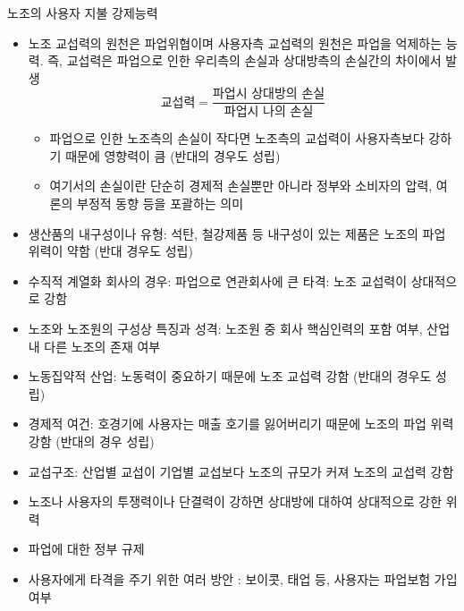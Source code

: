\documentclass[aspectratio=169,xcolor=dvipsnames,handout]{beamer}
\begin{document}
\begin{frame}[allowframebreaks]{노조의 사용자 지불 강제능력}
    \begin{itemize}[<+->]
        \item 노조 교섭력의 원천은 파업위협이며 사용자측 교섭력의 원천은 파업을 억제하는 능력. 즉, 교섭력은 파업으로 인한 우리측의 손실과 상대방측의 손실간의 차이에서 발생
            \[\text{교섭력} = \frac{\text{파업시 상대방의 손실}}{\text{파업시 나의 손실}}\]
        \begin{itemize}[<+->]
            \item 파업으로 인한 노조측의 손실이 작다면 노조측의 교섭력이 사용자측보다 강하기 때문에 영향력이 큼 (반대의 경우도 성립)
            \item 여기서의 손실이란 단순히 경제적 손실뿐만 아니라 정부와 소비자의 압력, 여론의 부정적 동향 등을 포괄하는 의미
        \end{itemize}
        \item 생산품의 내구성이나 유형: 석탄, 철강제품 등 내구성이 있는 제품은 노조의 파업 위력이 약함 (반대 경우도 성립)
        \item 수직적 계열화 회사의 경우: 파업으로 연관회사에 큰 타격: 노조 교섭력이 상대적으로 강함 
        \item 노조와 노조원의 구성상 특징과 성격: 노조원 중 회사 핵심인력의 포함 여부, 산업 내 다른  노조의 존재 여부
        \item 노동집약적 산업: 노동력이 중요하기 때문에 노조 교섭력 강함 (반대의 경우도 성립)
        \item 경제적 여건: 호경기에 사용자는 매출 호기를 잃어버리기 때문에 노조의 파업 위력 강함 (반대의 경우 성립)
        \item 교섭구조: 산업별 교섭이 기업별 교섭보다 노조의 규모가 커져 노조의 교섭력 강함
        \item 노조나 사용자의 투쟁력이나 단결력이 강하면 상대방에 대하여 상대적으로 강한 위력
        \item 파업에 대한 정부 규제
        \item 사용자에게 타격을 주기 위한 여러 방안 : 보이콧, 태업 등, 사용자는 파업보험 가입 여부
    \end{itemize}
\end{frame}

\end{document}
